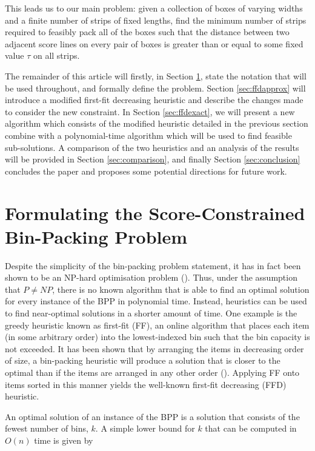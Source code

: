 \documentclass[oribibl]{llncs}
\begin{document}
This leads us to our main problem: given a collection of boxes of varying widths and a finite number of strips of fixed lengths, find the minimum number of strips required to feasibly pack all of the boxes such that the distance between two adjacent score lines on every pair of boxes is greater than or equal to some fixed value $\tau$ on all strips.

The remainder of this article will firstly, in Section \ref{sec:scbpp}, state the notation that will be used throughout, and formally define the problem. Section \ref{sec:ffdapprox} will introduce a modified first-fit decreasing heuristic and describe the changes made to consider the new constraint. In Section \ref{sec:ffdexact}, we will present a new algorithm which consists of the modified heuristic detailed in the previous section combine with a polynomial-time algorithm which will be used to find feasible sub-solutions. A comparison of the two heuristics and an analysis of the results will be provided in Section \ref{sec:comparison}, and finally Section \ref{sec:conclusion} concludes the paper and proposes some potential directions for future work.

\section{Formulating the Score-Constrained Bin-Packing Problem}
\label{sec:scbpp}

Despite the simplicity of the bin-packing problem statement, it has in fact been shown to be an NP-hard optimisation problem (\citealp{garey1979}). Thus, under the assumption that $P \neq NP$, there is no known algorithm that is able to find an optimal solution for every instance of the BPP in polynomial time. Instead, heuristics can be used to find near-optimal solutions in a shorter amount of time. One example is the greedy heuristic known as first-fit (FF), an online algorithm that places each item (in some arbitrary order) into the lowest-indexed bin such that the bin capacity is not exceeded. It has been shown that by arranging the items in decreasing order of size, a bin-packing heuristic will produce a solution that is closer to the optimal than if the items are arranged in any other order (\citealp{johnson1974fast}). Applying FF onto items sorted in this manner yields the well-known first-fit decreasing (FFD) heuristic.


An optimal solution of an instance of the BPP is a solution that consists of the fewest number of bins, $k$. A simple lower bound for $k$ that can be computed in $O(n)$ time is given by
\end{document}
